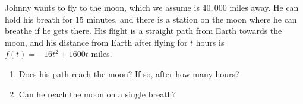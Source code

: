 Johnny wants to fly to the moon, which we assume is $40{,}000$ miles away. He can hold his breath for $15$ minutes, and there is a station on the moon where he can breathe if he gets there. His flight is a straight path from Earth towards the moon, and his distance from Earth after flying for $t$ hours is $f(t)=-16t^2+1600t$ miles.
\begin{enumerate}
\item[(a)] Does his path reach the moon? If so, after how many hours?
\item[(b)] Can he reach the moon on a single breath?
\end{enumerate}
